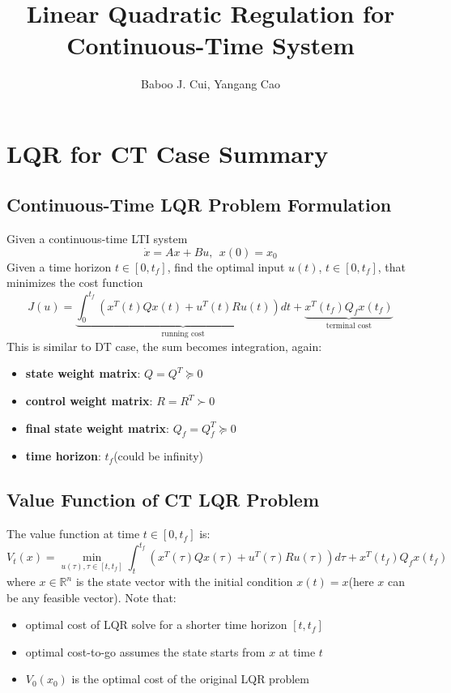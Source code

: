 \documentclass[10pt,a4paper,oneside]{article}
\author{Baboo J. Cui, Yangang Cao}
\title{Linear Quadratic Regulation for Continuous-Time System}
\begin{document}
\maketitle
\tableofcontents

\newpage
\section{LQR for CT Case Summary}

\subsection{Continuous-Time LQR Problem Formulation}
Given a continuous-time LTI system
\[
\dot{x} = Ax+Bu,\ \ x(0)=x_0
\]
Given a time horizon $t \in [0, t_f]$, find the optimal input $u(t)$, $t \in [0, t_f]$, that minimizes the cost function
\[
J(u)=\underbrace{\int_{0}^{t_{f}} \left(x^{T}(t) Q x(t)+u^{T}(t) R u(t)\right) dt}_{\text { running cost }} +\underbrace{x^{T}\left(t_{f}\right) Q_{f} x\left(t_{f}\right)}_{\text { terminal cost }}
\]
This is similar to DT case, the sum becomes integration, again:
\begin{itemize}
\item \textbf{state weight matrix}: $Q=Q^T \succeq 0$
\item \textbf{control weight matrix}: $R=R^T\succ 0$
\item \textbf{final state weight matrix}: $Q_f=Q^T_f \succeq 0$ 
\item \textbf{time horizon}: $t_f$(could be infinity)
\end{itemize}

\subsection{Value Function of CT LQR Problem}
The value function at time $t\in[0,t_f]$ is:
\[
V_{t}(x)=\min _{u(\tau), \tau \in \left[t, t_{f}\right]} \int_{t}^{t_{f}} \left(x^{T} (\tau) Q x(\tau)+u^{T}(\tau) R u(\tau)\right) d \tau + x^{T}\left(t_{f}\right) Q_{f} x\left(t_{f}\right)
\]
where $x \in \mathbb{R}^n$ is the state vector with the initial condition $x(t)=x$(here $x$ can be any feasible vector). Note that:
\begin{itemize}
\item optimal cost of LQR solve for a shorter time horizon $[t,t_f]$
\item optimal cost-to-go assumes the state starts from $x$ at time $t$
\item $V_0(x_0)$ is the optimal cost of the original LQR problem
\end{itemize}
\end{document}
